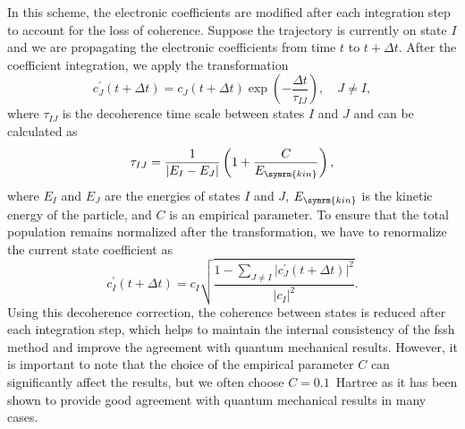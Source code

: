 In this scheme, the electronic coefficients are modified after each integration step to account for the loss of coherence. Suppose the trajectory is currently on state $I$ and we are propagating the electronic coefficients from time $t$ to $t+\Delta t$. After the coefficient integration, we apply the transformation
\begin{equation}\label{eq:granucci_persico_decoherence}
c^\prime_J(t+\Delta t)=c_J(t+\Delta t)\exp\left(-\frac{\Delta t}{\tau_{IJ}}\right),\quad J\neq I,
\end{equation}
where $\tau_{IJ}$ is the decoherence time scale between states $I$ and $J$ and can be calculated as
\begin{equation}\label{eq:granucci_persico_decoherence_time_scale}
\tau_{IJ}=\frac{1}{\lvert E_I-E_J\rvert}\left(1+\frac{C}{E_{\symrm{kin}}}\right),
\end{equation}
where $E_I$ and $E_J$ are the energies of states $I$ and $J$, $E_{\symrm{kin}}$ is the kinetic energy of the particle, and $C$ is an empirical parameter. To ensure that the total population remains normalized after the transformation, we have to renormalize the current state coefficient as
\begin{equation}\label{eq:granucci_persico_decoherence_renormalization}
c^\prime_I(t+\Delta t)=c_I\sqrt{\frac{1-\sum_{J\neq I}\lvert c^\prime_J(t+\Delta t)\rvert^2}{\lvert c_I\rvert^2}}.
\end{equation}
Using this decoherence correction, the coherence between states is reduced after each integration step, which helps to maintain the internal consistency of the \gls{fssh} method and improve the agreement with quantum mechanical results. However, it is important to note that the choice of the empirical parameter $C$ can significantly affect the results, but we often choose $C=0.1$~Hartree as it has been shown to provide good agreement with quantum mechanical results in many cases.\supercite{10.1063/1.1793991}
